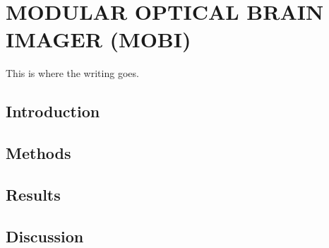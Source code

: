 
\chapter{MODULAR OPTICAL BRAIN IMAGER (MOBI)} %
\label{chap:mobi}
This is where the writing goes. 



\section{Introduction} %
\label{chap:mobi:introduction}



\section{Methods}
\label{chap:mobi:methods}



\section{Results}
\label{chap:mobi:results}



\section{Discussion}
\label{chap:mobi:discussion}

